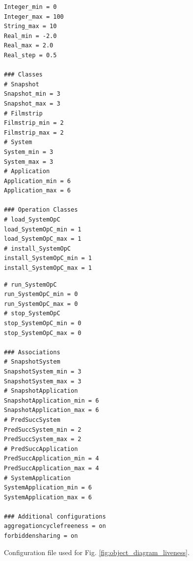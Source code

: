 \begin{figure}[htbp]
\caption{Configuration file used for Fig. \ref{fig:object_diagram_liveness}.}
\label{lst:configuration_file}

\begin{minipage}[t]{0.48\textwidth}
\begin{lstlisting}[basicstyle=\ttfamily\scriptsize, frame=single]
Integer_min = 0
Integer_max = 100
String_max = 10
Real_min = -2.0
Real_max = 2.0
Real_step = 0.5

### Classes
# Snapshot
Snapshot_min = 3
Snapshot_max = 3
# Filmstrip
Filmstrip_min = 2
Filmstrip_max = 2
# System
System_min = 3
System_max = 3
# Application
Application_min = 6
Application_max = 6

### Operation Classes
# load_SystemOpC
load_SystemOpC_min = 1
load_SystemOpC_max = 1
# install_SystemOpC
install_SystemOpC_min = 1
install_SystemOpC_max = 1
\end{lstlisting}
\end{minipage}
\hfill
\begin{minipage}[t]{0.48\textwidth}
\begin{lstlisting}[basicstyle=\ttfamily\scriptsize, frame=single]
# run_SystemOpC
run_SystemOpC_min = 0
run_SystemOpC_max = 0
# stop_SystemOpC
stop_SystemOpC_min = 0
stop_SystemOpC_max = 0

### Associations
# SnapshotSystem
SnapshotSystem_min = 3
SnapshotSystem_max = 3
# SnapshotApplication
SnapshotApplication_min = 6
SnapshotApplication_max = 6
# PredSuccSystem
PredSuccSystem_min = 2
PredSuccSystem_max = 2
# PredSuccApplication
PredSuccApplication_min = 4
PredSuccApplication_max = 4
# SystemApplication
SystemApplication_min = 6
SystemApplication_max = 6

### Additional configurations
aggregationcyclefreeness = on
forbiddensharing = on
\end{lstlisting}
\end{minipage}
\end{figure}
    


